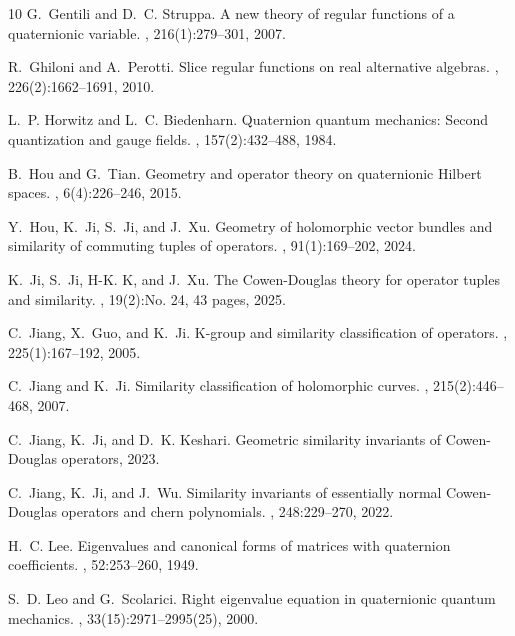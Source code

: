 \documentclass[pdflatex,sn-mathphys-num]{sn-jnl}%
\theoremstyle{thmstyleone}%
\theoremstyle{thmstyletwo}%
\theoremstyle{thmstylethree}%
\theoremstyle{definition}
\theoremstyle{remark}
\begin{document}
\begin{thebibliography}{10}
G.~Gentili and D.~C. Struppa.
\newblock A new theory of regular functions of a quaternionic variable.
, 216(1):279--301, 2007.

R.~Ghiloni and A.~Perotti.
\newblock Slice regular functions on real alternative algebras.
, 226(2):1662--1691, 2010.

L.~P. Horwitz and L.~C. Biedenharn.
\newblock Quaternion quantum mechanics: Second quantization and gauge fields.
, 157(2):432--488, 1984.

B.~Hou and G.~Tian.
\newblock Geometry and operator theory on quaternionic {H}ilbert spaces.
, 6(4):226--246, 2015.

Y.~Hou, K.~Ji, S.~Ji, and J.~Xu.
\newblock Geometry of holomorphic vector bundles and similarity of commuting
  tuples of operators.
, 91(1):169--202, 2024.

K.~Ji, S.~Ji, H-K. K, and J.~Xu.
\newblock The {C}owen-{D}ouglas theory for operator tuples and similarity.
, 19(2):No. 24, 43 pages,
  2025.

C.~Jiang, X.~Guo, and K.~Ji.
\newblock K-group and similarity classification of operators.
, 225(1):167--192, 2005.

C.~Jiang and K.~Ji.
\newblock Similarity classification of holomorphic curves.
, 215(2):446--468, 2007.

C.~Jiang, K.~Ji, and D.~K. Keshari.
\newblock Geometric similarity invariants of {C}owen-{D}ouglas operators, 2023.

C.~Jiang, K.~Ji, and J.~Wu.
\newblock Similarity invariants of essentially normal {C}owen-{D}ouglas
  operators and chern polynomials.
, 248:229--270, 2022.

H.~C. Lee.
\newblock Eigenvalues and canonical forms of matrices with quaternion
  coefficients.
, 52:253--260, 1949.

S.~D. Leo and G.~Scolarici.
\newblock Right eigenvalue equation in quaternionic quantum mechanics.
, 33(15):2971--2995(25),
  2000.


\end{thebibliography}
\end{document}
